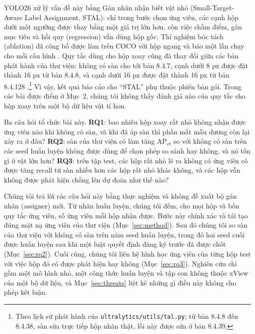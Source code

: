 \documentclass[11pt]{article}
\begin{document}
YOLO26 \cite{yolo26} xử lý vấn đề này bằng Gán nhãn nhận biết vật nhỏ (Small-Target-Aware Label Assignment, STAL): chỉ trong
bước chọn ứng viên, các cạnh hộp dưới một ngưỡng được thay bằng một giá trị lớn hơn, còn việc chấm điểm, gán mục tiêu và hồi
quy (regression) vẫn dùng hộp gốc. Thí nghiệm bóc tách (ablation) đã công bố được làm trên COCO với hộp ngang và báo một lần
chạy cho mỗi cấu hình \cite[Table~6]{yolo26}. Quy tắc dùng cho hộp xoay cũng đã thay đổi giữa các bản phát hành của thư viện:
không có sàn cho tới bản 8.4.7, cạnh dưới 8 px được đặt thành 16 px từ bản 8.4.8, và cạnh dưới 16 px được đặt thành 16 px từ
bản 8.4.128 \cite{ultralytics}.\footnote{Theo lịch sử phát hành của \texttt{ultralytics/utils/tal.py}; từ bản 8.4.8 đến 8.4.38,
sàn sửa trực tiếp hộp nhãn thật, lỗi này được sửa ở bản 8.4.39.} Vì vậy, kết quả báo cáo cho ``STAL'' phụ thuộc phiên bản
gói. Trong các bài được điểm ở Mục~2, chúng tôi không thấy đánh giá nào của quy tắc cho hộp xoay trên một bộ dữ liệu vật tí hon.

Ba câu hỏi tổ chức bài này. \textbf{RQ1}: bao nhiêu hộp xoay rất nhỏ không nhận được ứng viên nào khi không có sàn, và khi đã
áp sàn thì phần mất mẫu dương còn lại xảy ra ở đâu? \textbf{RQ2}: sàn của thư viện có làm tăng AP$_{vt}$ so với không có sàn trên
các seed huấn luyện không được dùng để chọn phép so sánh hay không, và nó tốn gì ở vật lớn hơn? \textbf{RQ3}: trên tập test, các
hộp rất nhỏ lẽ ra không có ứng viên có được tăng recall từ sàn nhiều hơn các hộp rất nhỏ khác không, và các hộp vẫn không được
phát hiện chồng lên dự đoán như thế nào?

Chúng tôi trả lời các câu hỏi này bằng thực nghiệm và không đề xuất bộ gán nhãn (assigner) mới. Từ nhãn huấn luyện, chúng tôi
đếm, cho mọi hộp và bốn quy tắc ứng viên, số ứng viên mỗi hộp nhận được. Bước này chính xác và tái tạo đúng mặt nạ ứng viên của
thư viện (Mục~\ref{sec:method}). Sau đó chúng tôi so sàn của thư viện với không có sàn trên năm seed huấn luyện, trong đó hai seed
cuối được huấn luyện sau khi một luật quyết định đăng ký trước đã được chốt (Mục~\ref{sec:rq2}). Cuối cùng, chúng tôi liên hệ hình
học ứng viên của từng hộp test với việc hộp đó có được phát hiện hay không (Mục~\ref{sec:rq3}). Nghiên cứu chỉ gồm một mô hình
nhỏ, một công thức huấn luyện và tập con không thuộc xView của một bộ dữ liệu, và Mục~\ref{sec:threats} liệt kê những gì điều
này không cho phép kết luận.
\end{document}
